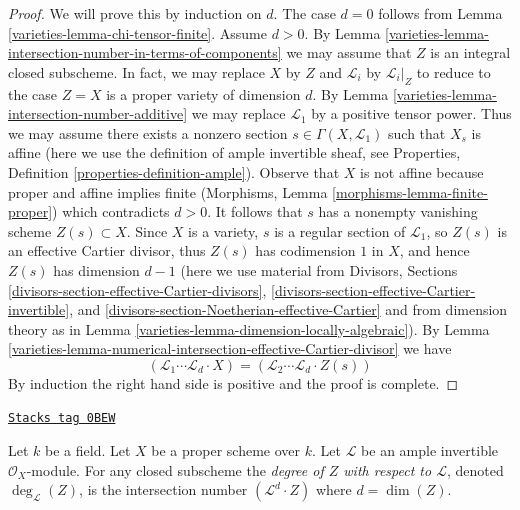 \begin{proof}

We will prove this by induction on $d$. The case $d = 0$
follows from Lemma \ref{varieties-lemma-chi-tensor-finite}. Assume $d > 0$.
By Lemma \ref{varieties-lemma-intersection-number-in-terms-of-components}
we may assume that $Z$ is an integral closed subscheme.
In fact, we may replace $X$ by $Z$ and $\mathcal{L}_i$
by $\mathcal{L}_i|_Z$ to reduce to the case $Z = X$ is a
proper variety of dimension $d$.
By Lemma \ref{varieties-lemma-intersection-number-additive}
we may replace $\mathcal{L}_1$ by a positive tensor power.
Thus we may assume there exists a nonzero section
$s \in \Gamma(X, \mathcal{L}_1)$
such that $X_s$ is affine (here we use the definition of
ample invertible sheaf, see
Properties, Definition \ref{properties-definition-ample}).
Observe that $X$ is not affine because proper and affine
implies finite (Morphisms, Lemma \ref{morphisms-lemma-finite-proper})
which contradicts $d > 0$. It follows that $s$ has a nonempty vanishing
scheme $Z(s) \subset X$. Since $X$ is a variety, $s$ is a regular section
of $\mathcal{L}_1$, so $Z(s)$ is an effective Cartier divisor,
thus $Z(s)$ has codimension $1$ in $X$, and
hence $Z(s)$ has dimension $d - 1$ (here we use material from
Divisors, Sections \ref{divisors-section-effective-Cartier-divisors},
\ref{divisors-section-effective-Cartier-invertible}, and
\ref{divisors-section-Noetherian-effective-Cartier}
and from dimension theory as in Lemma \ref{varieties-lemma-dimension-locally-algebraic}).
By Lemma \ref{varieties-lemma-numerical-intersection-effective-Cartier-divisor}
we have
$$
(\mathcal{L}_1 \cdots \mathcal{L}_d \cdot X) =
(\mathcal{L}_2 \cdots \mathcal{L}_d \cdot Z(s))
$$
By induction the right hand side is positive and the proof is complete.
\end{proof}

\begin{definition}[Degree]
\label{varieties-definition-degree}
\href{https://stacks.math.columbia.edu/tag/0BEW}{\texttt{Stacks tag 0BEW}}

Let $k$ be a field. Let $X$ be a proper scheme over $k$. Let
$\mathcal{L}$ be an ample invertible $\mathcal{O}_X$-module.
For any closed subscheme the {\it degree of $Z$ with respect to
$\mathcal{L}$}, denoted $\deg_\mathcal{L}(Z)$, is
the intersection number $(\mathcal{L}^d \cdot Z)$
where $d = \dim(Z)$.
\end{definition}

